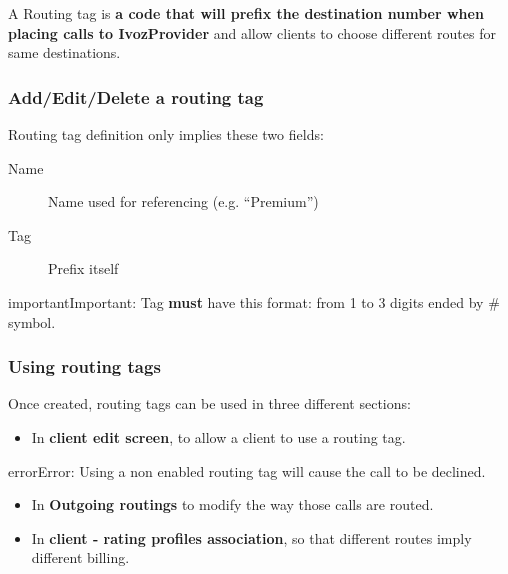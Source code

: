 \documentclass[letterpaper,10pt,english]{sphinxmanual}
\begin{document}
A Routing tag is \textbf{a code that will prefix the destination number when placing calls to IvozProvider} and allow clients
to choose different routes for same destinations.


\subsubsection{Add/Edit/Delete a routing tag}
\label{administration_portal/brand/routing/routing_tags:add-edit-delete-a-routing-tag}
Routing tag definition only implies these two fields:
\begin{description}
\item[{Name}] \leavevmode{}\label{administration_portal/brand/routing/routing_tags:term-name}
Name used for referencing (e.g. ``Premium'')

\item[{Tag}] \leavevmode{}\label{administration_portal/brand/routing/routing_tags:term-tag}
Prefix itself

\end{description}

\begin{notice}{important}{Important:}
Tag \textbf{must} have this format: from 1 to 3 digits ended by \# symbol.
\end{notice}


\subsubsection{Using routing tags}
\label{administration_portal/brand/routing/routing_tags:using-routing-tags}
Once created, routing tags can be used in three different sections:
\begin{itemize}
\item {} 
In \textbf{client edit screen}, to allow a client to use a routing tag.

\end{itemize}

\begin{notice}{error}{Error:}
Using a non enabled routing tag will cause the call to be declined.
\end{notice}
\begin{itemize}
\item {} 
In \textbf{Outgoing routings} to modify the way those calls are routed.

\item {} 
In \textbf{client - rating profiles association}, so that different routes imply different billing.

\end{itemize}
\end{document}
